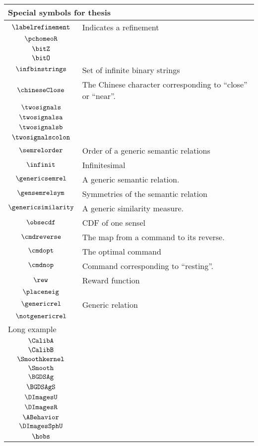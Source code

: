 \begin{longtable}{cl}
 \multicolumn{2}{l}{Special symbols for thesis}\\ 
 \hline
$\labelrefinement$ &  Indicates a refinement\\ 
 $\pchomeoR$ & \\ 
 $\bitZ$ & \\ 
 $\bitO$ & \\ 
 $\infbinstrings$ &  Set of infinite binary strings\\ 
 $\chineseClose$ &  The Chinese character corresponding to ``close'' or ``near''. \\ 
 $\twosignals$ & \\ 
 $\twosignalsa$ & \\ 
 $\twosignalsb$ & \\ 
 $\twosignalscolon$ & \\ 
 $\semrelorder$ &  Order of a generic semantic relations\\ 
 $\infinit$ &  Infinitesimal\\ 
 $\genericsemrel$ &  A generic semantic relation.\\ 
 $\gensemrelsym$ &  Symmetries of the semantic relation\\ 
 $\genericsimilarity$ &  A generic similarity measure.\\ 
 $\obsecdf$ &  CDF of one sensel\\ 
 $\cmdreverse$ &  The map from a command to its reverse.\\ 
 $\cmdopt$ &  The optimal command\\ 
 $\cmdnop$ &  Command corresponding to ``resting''.\\ 
 $\rew$ &  Reward function\\ 
 $\placeneig$ & \\ 
 $\genericrel$ &  Generic relation\\ 
 $\notgenericrel$ & \\ 
 \multicolumn{2}{l}{Long example}\\ 
 \hline
$\CalibA$ & \\ 
 $\CalibB$ & \\ 
 $\Smoothkernel$ & \\ 
 $\Smooth$ & \\ 
 $\BGDSAg$ & \\ 
 $\BGDSAgS$ & \\ 
 $\DImagesU$ & \\ 
 $\DImagesR$ & \\ 
 $\ABehavior$ & \\ 
 $\DImagesSphU$ & \\ 
 $\hobs$ & \\ 

\end{longtable}
